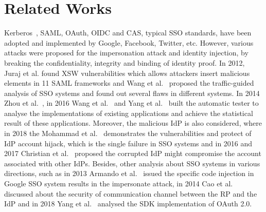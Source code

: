 \section{Related Works}%
\label{sec:related}
Kerberos~\cite{Kerberos}, SAML, OAuth, OIDC and CAS\cite{aubry2004esup}, typical SSO standards, have been adopted and implemented by Google, Facebook, Twitter, etc.
However, various attacks were proposed for the impersonation attack and identity injection, by breaking the confidentiality, integrity and binding of identity proof. 
In 2012, Juraj et al.\cite{SomorovskyMSKJ12} found XSW vulnerabilities which allows attackers insert malicious elements in 11 SAML frameworks and Wang et al.~\cite{WangCW12} proposed the traffic-guided analysis of SSO systems and found out several flaws in different systems. In 2014 Zhou et al.~\cite{ZhouE14}, in 2016 Wang et al.~\cite{WangZLG16} and Yang et al.~\cite{YangLLZH16} built the automatic tester to analyse the implementations of existing applications and achieve the statistical result of these applications. Moreover, the malicious IdP is also considered, where in 2018 the Mohammad et al.~\cite{GhasemisharifRC18} demonstrates the vulnerabilities and protect of IdP account hijack, which is the single failure in SSO systems and in 2016 and 2017 Christian et al.~\cite{MainkaMS16, MainkaMSW17} proposed the corrupted IdP might compromise the account associated with other IdPs. Besides, other analysis about SSO systems in various directions, such as in 2013 Armando et al.~\cite{ArmandoCCCPS13} issued the specific code injection in Google SSO system results in the impersonate attack, in 2014 Cao et al.~\cite{CaoSBKVC14} discussed about the security of communication channel between the RP and the IdP and in 2018 Yang et al.~\cite{YangLCZ18} analysed the SDK implementation of OAuth 2.0.


